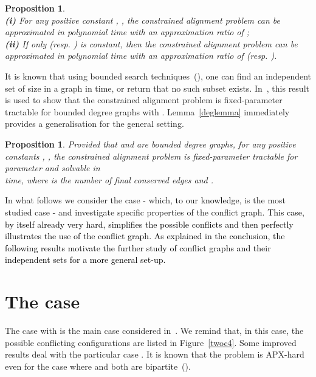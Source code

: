 \documentclass[final]{dmtcs-episciences}
\newtheorem{proposition}[theorem]{Proposition}
\newcommand\mar[1]{\textcolor{black}{#1}}
\begin{document}
\begin{proposition}\label{prop:generalapprox}\mbox{}\\
\textbf{ (i)} For any positive constant , , 
the constrained alignment problem can be approximated in polynomial time with an approximation ratio of
;\\
\textbf{ (ii)} If only  (resp. ) is constant, then the constrained alignment problem can be approximated in polynomial time with an approximation ratio of
 (resp. ).
\end{proposition}

It is known that using bounded search techniques~(\citet{ParameterizedComplexity}),
one can find an independent set of size  in a graph  in  time, or return that no such subset exists.
In~\citet{Fertin200990}, this result  is used to show that the constrained alignment problem is fixed-parameter tractable for bounded degree graphs with . Lemma~\ref{deglemma} immediately provides a generalisation for the general setting.

\begin{proposition}\label{prop:parameter1}
Provided that  and  are bounded degree graphs, for any positive constants , , 
the constrained alignment problem is fixed-parameter tractable for parameter  and 
solvable in\\  time, where  is the number of final conserved edges and .
\end{proposition}

In what follows we consider the case  \-- which, \mar{to our knowledge}, is the most studied case \-- and investigate specific properties of the conflict graph. \mar{This case, by itself already very hard, simplifies the possible conflicts and then perfectly illustrates the use of the conflict graph. As explained in the conclusion, the following results motivate the further study of conflict graphs and their independent sets for a more general set-up. } 


\section{The case }\label{sec:m2is1}


The case with  is the main case considered in~\citet{Fertin200990}.  We remind that, in this case,  the possible conflicting configurations are listed in Figure~\ref{twoc4}.  Some improved results deal with the particular case . 
It is 
known that the problem is APX-hard even for the case where
 and both  are bipartite~(\citet{Fertin200990}). 
\end{document}
